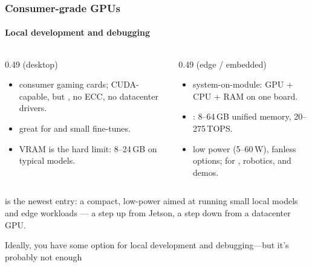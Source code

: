 \documentclass[10pt,aspectratio=169,notheorems]{beamer}
\begin{document}
\begin{frame}
    \frametitle{Consumer-grade GPUs}
    \framesubtitle{Local development and debugging}
   
    \vspace{0.6em}
    \begin{columns}[t]
        \begin{column}{0.49\textwidth}
         (desktop)
        \begin{itemize}
            \item consumer gaming cards; CUDA-capable, but , no ECC, no datacenter drivers.
            \item great for  and small fine-tunes.
            \item VRAM is the hard limit: 8--24\,GB on typical models.
        \end{itemize}
        \end{column}

        \begin{column}{0.49\textwidth}
         (edge / embedded)
        \begin{itemize}
            \item system-on-module: GPU + CPU + RAM on one board.
            \item {}: 8--64\,GB unified memory, 20--275\,TOPS.
            \item low power (5--60\,W), fanless options; for , robotics, and demos.
        \end{itemize}
        \end{column}
    \end{columns}

    \vspace{1em}
     is the newest entry: a compact, low-power
     aimed at running small local models
    and edge workloads --- a step up from Jetson, a step down from a datacenter GPU.

    \vspace{1em}
    \textcolor{SlidemintMuted}{Ideally, you have some option for local development and debugging---but it's probably not enough}
\end{frame}
\end{document}
